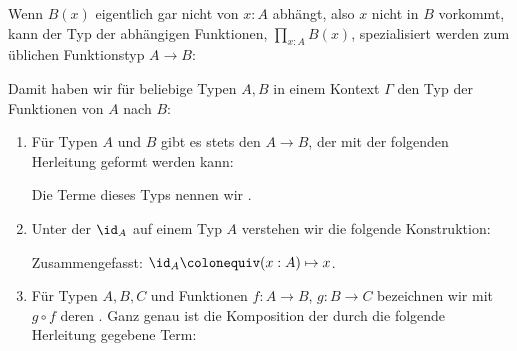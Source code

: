 Wenn $B(x)$ eigentlich gar nicht von $x:A$ abhängt, also $x$ nicht in $B$ vorkommt,
kann der Typ der abhängigen Funktionen, $\prod_{x:A}B(x)$, spezialisiert werden zum üblichen Funktionstyp $A\to B$:

Damit haben wir für beliebige Typen $A,B$ in einem Kontext $\Gamma$ den Typ der Funktionen von $A$ nach $B$:

\begin{definition}
  \begin{enumerate}
  \item Für Typen $A$ und $B$ gibt es stets den  $A\to B$, der mit der folgenden Herleitung geformt werden kann:
    \begin{mathpar}
    \end{mathpar}
    Die Terme dieses Typs nennen wir .
  \item Unter der  $\id_A$ auf einem Typ $A$ verstehen wir die folgende Konstruktion:
    \begin{mathpar}
    \end{mathpar}
    Zusammengefasst: $\id_A\colonequiv (x : A)\mapsto x$.
  \item Für Typen $A,B,C$ und Funktionen $f:A\to B$, $g:B\to C$ bezeichnen wir mit $g\circ f$ deren \index{$\circ$}.
    Ganz genau ist die Komposition der durch die folgende Herleitung gegebene Term:
    \begin{mathpar}
\end{mathpar}
\end{enumerate}
\end{definition}
